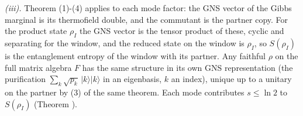 \emph{(iii).} Theorem (1)-(4) applies to each mode factor: the GNS vector of the Gibbs marginal is its thermofield double, and the commutant is the partner copy. For the product state $\rho_{I}$ the GNS vector is the tensor product of these, cyclic and separating for the window, and the reduced state on the window is $\rho_{I}$, so $S(\rho_{I})$ is the entanglement entropy of the window with its partner. Any faithful $\rho$ on the full matrix algebra $F$ has the same structure in its own GNS representation (the purification $\sum_{k}\sqrt{p_{k}}\,|k\rangle|k\rangle$ in an eigenbasis, $k$ an index), unique up to a unitary on the partner by (3) of the same theorem. Each mode contributes $s \le \ln 2$ to $S(\rho_{I})$ (Theorem ).


